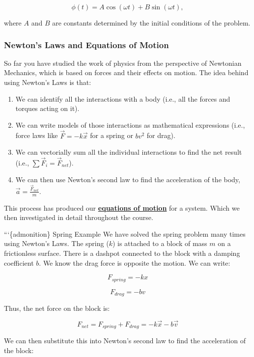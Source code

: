 \documentclass[11pt]{article}
\providecommand{\tightlist}{%
      \setlength{\itemsep}{0pt}\setlength{\parskip}{0pt}}
\begin{document}
\[\phi(t) = A \cos(\omega t) + B \sin(\omega t),\]

where \(A\) and \(B\) are constants determined by the initial conditions
of the problem.

    \subsubsection{Newton's Laws and Equations of
Motion}\label{newtons-laws-and-equations-of-motion}

So far you have studied the work of physics from the perspective of
Newtonian Mechanics, which is based on forces and their effects on
motion. The idea behind using Newton's Laws is that:

\begin{enumerate}
\def\labelenumi{\arabic{enumi}.}
\tightlist
\item
  We can identify all the interactions with a body (i.e., all the forces
  and torques acting on it).
\item
  We can write models of those interactions as mathematical expressions
  (i.e., force laws like \(\vec{F} = -k \vec{x}\) for a spring or
  \(b v^2\) for drag).
\item
  We can vectorially sum all the individual interactions to find the net
  result (i.e., \(\sum \vec{F}_i = \vec{F}_{net}\)).
\item
  We can then use Newton's second law to find the acceleration of the
  body, \(\vec{a} = \frac{\vec{F}_{net}}{m}\).
\end{enumerate}

This process has produced our
\textbf{\href{https://en.wikipedia.org/wiki/Equation_of_motion}{equations
of motion}} for a system. Which we then investigated in detail
throughout the course.

```\{admonition\} Spring Example We have solved the spring problem many
times using Newton's Laws. The spring (\(k\)) is attached to a block of
mass \(m\) on a frictionless surface. There is a dashpot connected to
the block with a damping coefficient \(b\). We know the drag force is
opposite the motion. We can write:

\[F_{spring} = -k x\]

\[F_{drag} = -b v\]

Thus, the net force on the block is:

\[F_{net} = F_{spring} + F_{drag} = -k \vec{x} - b \vec{v}\]

We can then substitute this into Newton's second law to find the
acceleration of the block:
\end{document}
